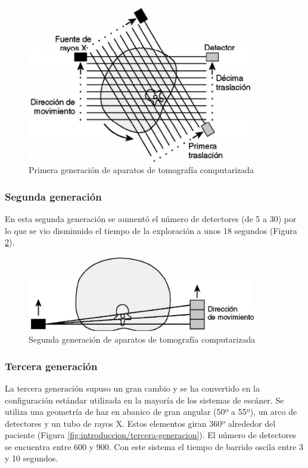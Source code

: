 \begin{figure}[H]
	\centering
	\includegraphics[width=10cm]{imagenes/introduccion/primera-generacion}
	\caption{Primera generación de aparatos de tomografía computarizada \cite{historia-tomografia}}
	\label{fig:introduccion/primera-generacion}
\end{figure}

\subsubsection{Segunda generación}

En esta segunda generación se aumentó el número de detectores (de 5 a 30) por lo que se vio disminuido el tiempo de la exploración a unos 18 segundos (Figura \ref{fig:introduccion/segunda-generacion}).

\begin{figure}[H]
	\centering
	\includegraphics[width=10cm]{imagenes/introduccion/segunda-generacion}
	\caption{Segunda generación de aparatos de tomografía computarizada \cite{historia-tomografia}}
	\label{fig:introduccion/segunda-generacion}
\end{figure}

\subsubsection{Tercera generación}

La tercera generación supuso un gran cambio y se ha convertido en la configuración estándar utilizada en la mayoría de los sistemas de escáner. Se utiliza una geometría de haz en abanico de gran angular (50º a 55º), un arco de detectores y un tubo de rayos X. Estos elementos giran 360º alrededor del paciente (Figura \ref{fig:introduccion/tercera-generacion}). El número de detectores se encuentra entre 600 y 900. Con este sistema el tiempo de barrido oscila entre 3 y 10 segundos.

